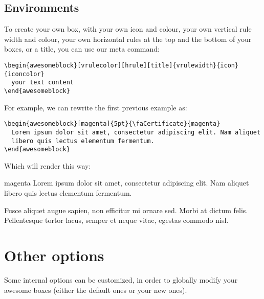 \documentclass[a4paper,12pt]{article}
\begin{document}

\subsection{Environments}

To create your own box, with your own icon and colour, your own
vertical rule width and colour, your own horizontal rules at the top
and the bottom of your boxes, or a title, you can use our meta
command:

\begin{verbatim}
\begin{awesomeblock}[vrulecolor][hrule][title]{vrulewidth}{icon}{iconcolor}
  your text content
\end{awesomeblock}
\end{verbatim}

For example, we can rewrite the first previous example as:

\begin{verbatim}
\begin{awesomeblock}[magenta]{5pt}{\faCertificate}{magenta}
  Lorem ipsum dolor sit amet, consectetur adipiscing elit. Nam aliquet
  libero quis lectus elementum fermentum.
\end{awesomeblock}
\end{verbatim}

Which will render this way:

\begin{awesomeblock}[magenta]{5pt}{\faCertificate}{magenta}
  Lorem ipsum dolor sit amet, consectetur adipiscing elit. Nam aliquet
  libero quis lectus elementum fermentum.

  Fusce aliquet augue sapien, non efficitur mi ornare sed. Morbi at
  dictum felis. Pellentesque tortor lacus, semper et neque vitae,
  egestas commodo nisl.
\end{awesomeblock}


\section{Other options}

Some internal options can be customized, in order to globally modify
your awesome boxes (either the default ones or your new ones).
\end{document}
